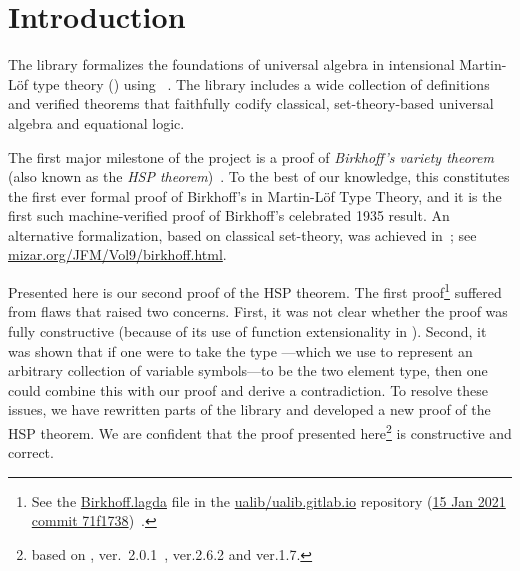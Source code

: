 \section{Introduction}
The \agdaalgebras library \cite{ualib_v2.0.1} formalizes the foundations of universal algebra
in intensional Martin-Löf type theory (\mltt) using \agda~\cite{Norell:2007,agdaref}.
The library includes a wide collection of definitions and verified theorems that faithfully codify
classical, set-theory-based universal algebra and equational
logic.

The first major milestone of the \agdaalgebras project is a proof of \emph{Birkhoff's
variety theorem} (also known as the \emph{HSP theorem})~\cite{Birkhoff:1935}.
To the best of our knowledge, this constitutes the first ever formal proof of
Birkhoff's in Martin-Löf Type Theory, and it is the first such machine-verified proof of Birkhoff's
celebrated 1935 result.  An alternative formalization, based on classical
set-theory, was achieved in~\cite{birkhoff-in-mizar:1999}; see \href{http://www.mizar.org/JFM/Vol9/birkhoff.html\#BIB21}{mizar.org/JFM/Vol9/birkhoff.html}.

Presented here is our second proof of the HSP theorem. The first proof\footnote{See the
 \href{https://github.com/ualib/ualib.github.io/blob/71f173858701398d56224dd79d152c380c0c2b5e/src/lagda/UALib/Birkhoff.lagda}{\textsf{Birkhoff.lagda}} file
 in the \href{https://github.com/ualib/ualib.github.io}{\textsf{ualib/ualib.gitlab.io}}
 repository (\href{https://github.com/ualib/ualib.github.io/commit/71f173858701398d56224dd79d152c380c0c2b5e}{15
 Jan 2021 commit 71f1738})~\cite{ualib_v1.0.0}.}
suffered from flaws that raised two concerns. First, it was not clear whether the
proof was fully constructive (because of its use of function extensionality in \mltt). Second,
it was shown that if one were to take the type
---which we use to represent an arbitrary collection of
variable symbols---to be  the two element type, then one could combine this with our
proof and derive a contradiction. To resolve these issues, we have rewritten parts of the library and
developed a new proof of the HSP theorem. We are confident that the
proof presented here\footnote{based on \agdaalgebras, ver.~2.0.1~\cite{ualib_v2.0.1}, \agda ver.2.6.2 and \agdastdlib ver.1.7.} is constructive and
 correct. %

